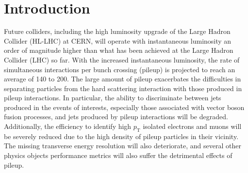 \documentclass[preprint,1p]{elsarticle}
\begin{document}
\tableofcontents


\section{Introduction} 

Future colliders, including the high luminosity upgrade of the Large Hadron
Collider (HL-LHC) at CERN, will operate with instantaneous luminosity an order of magnitude higher than what has been achieved at the
Large Hadron Collider (LHC) so far.
With the increased instantaneous luminosity, the rate of simultaneous
interactions per bunch crossing (pileup) is projected to reach an average of 140
to 200. The large amount of pileup exacerbates the difficulties in separating 
particles from the hard scattering interaction with those
produced in pileup interactions. In particular, the ability to discriminate between
jets produced in the events of interests, especially those associated with vector 
boson fusion processes, and jets produced by pileup interactions will be
degraded. Additionally, the efficiency to identify high $p_{\mathrm{T}}$ isolated electrons
and muons will be severely reduced due to the high density of pileup particles
in their vicinity. The missing transverse energy resolution will also deteriorate, and several
other physics objects performance metrics will also suffer the
detrimental effects of pileup.
\end{document}
